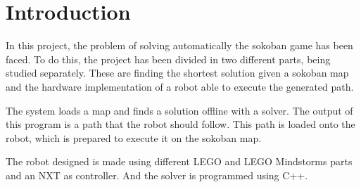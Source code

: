 \section{Introduction}

In this project, the problem of solving automatically the sokoban game has been faced.
To do this, the project has been divided in two different parts, being studied separately.
These are finding the shortest solution given a sokoban map and the hardware implementation of a robot able to execute the generated path.

The system loads a map and finds a solution offline with a solver. 
The output of this program is a path that the robot should follow. 
This path is loaded onto the robot, which is prepared to execute it on the sokoban map.

The robot designed is made using different LEGO and LEGO Mindstorms parts and an NXT as controller.
And the solver is programmed using C++.

